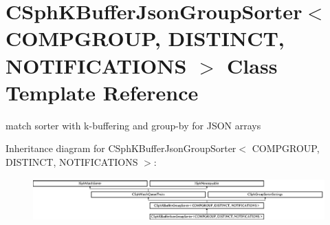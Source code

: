 \hypertarget{classCSphKBufferJsonGroupSorter}{\section{C\-Sph\-K\-Buffer\-Json\-Group\-Sorter$<$ C\-O\-M\-P\-G\-R\-O\-U\-P, D\-I\-S\-T\-I\-N\-C\-T, N\-O\-T\-I\-F\-I\-C\-A\-T\-I\-O\-N\-S $>$ Class Template Reference}
\label{classCSphKBufferJsonGroupSorter}
}


match sorter with k-\/buffering and group-\/by for J\-S\-O\-N arrays  


Inheritance diagram for C\-Sph\-K\-Buffer\-Json\-Group\-Sorter$<$ C\-O\-M\-P\-G\-R\-O\-U\-P, D\-I\-S\-T\-I\-N\-C\-T, N\-O\-T\-I\-F\-I\-C\-A\-T\-I\-O\-N\-S $>$\-:\begin{figure}[H]
\begin{center}
\leavevmode
\includegraphics[height=1.609195cm]{classCSphKBufferJsonGroupSorter}
\end{center}
\end{figure}
